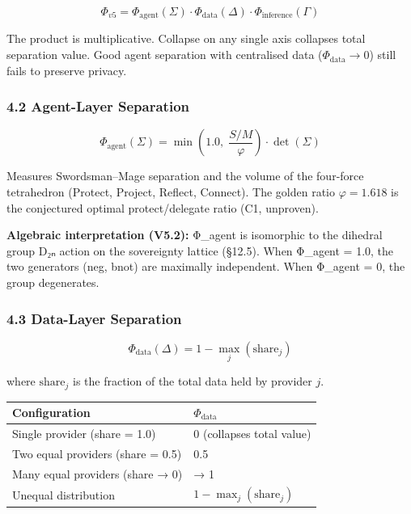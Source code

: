\documentclass[
  11pt,
]{article}
\newcounter{none} %
\begin{document}
\[\Phi_{v5} = \Phi_{\text{agent}}(\Sigma) \cdot \Phi_{\text{data}}(\Delta) \cdot \Phi_{\text{inference}}(\Gamma)\]

The product is multiplicative. Collapse on any single axis collapses
total separation value. Good agent separation with centralised data
(\(\Phi_{\text{data}} \to 0\)) still fails to preserve privacy.

\subsubsection{4.2 Agent-Layer Separation}\label{agent-layer-separation}

\[\Phi_{\text{agent}}(\Sigma) = \min\!\left(1.0,\; \frac{S/M}{\varphi}\right) \cdot \det(\Sigma)\]

Measures Swordsman--Mage separation and the volume of the four-force
tetrahedron (Protect, Project, Reflect, Connect). The golden ratio
\(\varphi = 1.618\) is the conjectured optimal protect/delegate ratio
(C1, unproven).

\textbf{Algebraic interpretation (V5.2):} Φ\_agent is isomorphic to the
dihedral group D₂ₙ action on the sovereignty lattice (§12.5). When
Φ\_agent = 1.0, the two generators (neg, bnot) are maximally
independent. When Φ\_agent = 0, the group degenerates.

\subsubsection{4.3 Data-Layer Separation}\label{data-layer-separation}

\[\Phi_{\text{data}}(\Delta) = 1 - \max_j(\text{share}_j)\]

where \(\text{share}_j\) is the fraction of the total data held by
provider \(j\).

{\def\LTcaptype{none} %
\begin{longtable}[]{@{}ll@{}}
\toprule\noalign{}
Configuration & \(\Phi_{\text{data}}\) \\
\midrule\noalign{}
\endhead
\bottomrule\noalign{}
\endlastfoot
Single provider (share = 1.0) & 0 (collapses total value) \\
Two equal providers (share = 0.5) & 0.5 \\
Many equal providers (share → 0) & → 1 \\
Unequal distribution & \(1 - \max_j(\text{share}_j)\) \\
\end{longtable}
}
\end{document}
